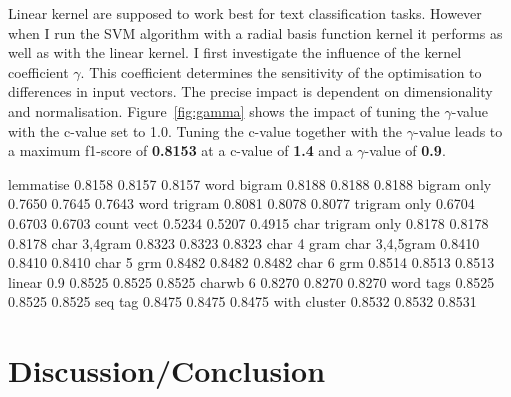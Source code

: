 \documentclass[11pt]{article}
\begin{document}
Linear kernel are supposed to work best for text classification tasks. However when I run the SVM algorithm with a radial basis function kernel it performs as well as with the linear kernel. I first investigate the influence of the kernel coefficient $\gamma$. This coefficient determines the sensitivity of the optimisation to differences in input vectors. The precise impact is dependent on dimensionality and normalisation. Figure~\ref{fig:gamma} shows the impact of tuning the $\gamma$-value with the c-value set to 1.0. Tuning the c-value together with the $\gamma$-value leads to a maximum f1-score of \textbf{0.8153} at a c-value of \textbf{1.4} and a $\gamma$-value of \textbf{0.9}.





lemmatise 0.8158    0.8157    0.8157
word bigram 0.8188    0.8188    0.8188
bigram only 0.7650    0.7645    0.7643
word trigram 0.8081    0.8078    0.8077
trigram only 0.6704    0.6703    0.6703
count vect 0.5234    0.5207    0.4915
char trigram only 0.8178    0.8178    0.8178
char 3,4gram 0.8323    0.8323    0.8323
char 4 gram
char 3,4,5gram 0.8410    0.8410    0.8410
char 5 grm 0.8482    0.8482    0.8482
char 6 grm 0.8514    0.8513    0.8513
linear 0.9 0.8525    0.8525    0.8525
charwb 6 0.8270    0.8270    0.8270
word tags 0.8525    0.8525    0.8525
seq tag 0.8475    0.8475    0.8475
with cluster 0.8532    0.8532    0.8531


\section{Discussion/Conclusion}






\end{document}
